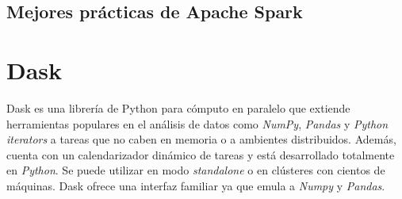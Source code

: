 \subsection{Mejores prácticas de Apache Spark}

\section{Dask}

Dask es una librería de Python para cómputo en paralelo que extiende herramientas populares en el análisis de datos como \textit{NumPy}, \textit{Pandas} y \textit{Python iterators} a tareas que no caben en memoria o a ambientes distribuidos. Además, cuenta con un calendarizador dinámico de tareas y está desarrollado totalmente en \textit{Python}. Se puede utilizar en modo \textit{standalone} o en clústeres con cientos de máquinas. Dask ofrece una interfaz familiar ya que emula a \textit{Numpy} y \textit{Pandas}. 




